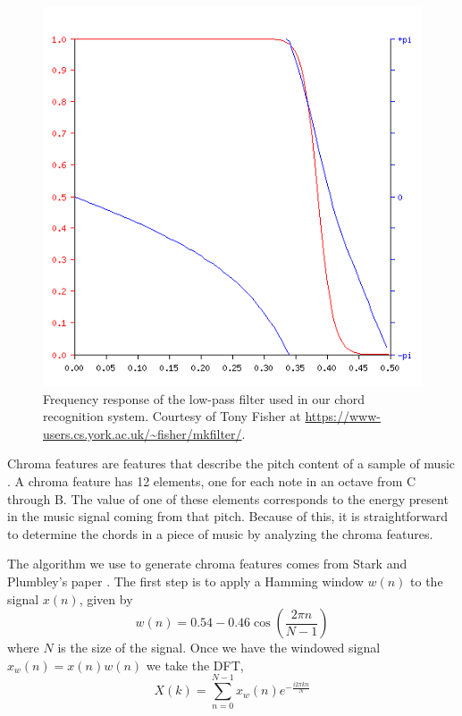 \documentclass[journal]{IEEEtran}
\begin{document}
\begin{figure}[t]
    \centering
    \includegraphics[width=\linewidth]{../Figures/frequency_response}
    \caption{Frequency response of the low-pass filter used in our chord recognition system.
    Courtesy of Tony Fisher at \url{https://www-users.cs.york.ac.uk/~fisher/mkfilter/}.}
    \label{fig:frequency_response}
\end{figure}

Chroma features are features that describe the pitch content of a sample of music \cite{jiang}. A chroma feature has 12 elements, one for each note in an octave from C through B. The value of one of these elements corresponds to the energy present in the music signal coming from that pitch. Because of this, it is straightforward to determine the chords in a piece of music by analyzing the chroma features.

The algorithm we use to generate chroma features comes from Stark and Plumbley’s paper \cite{stark}. The first step is to apply a Hamming window $w(n)$ to the signal $x(n)$, given by
\begin{equation}
    w(n) = 0.54 - 0.46\cos\!\left(\frac{2\pi n}{N - 1}\right)
    \label{eq:window}
\end{equation}
where $N$ is the size of the signal. Once we have the windowed signal $x_w(n) = x(n)w(n)$ we take the DFT,
\begin{equation}
    X(k) = \sum_{n = 0}^{N - 1}x_w(n)e^{-\frac{i2\pi kn}{N}}
    \label{eq:dft}
\end{equation}
\end{document}
